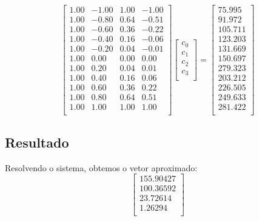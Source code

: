 \documentclass[12pt,a4paper]{article}
\begin{document}
\[
\left[
\begin{array}{cccc}
    1.00 & -1.00 & 1.00 & -1.00 \\
    1.00 & -0.80 & 0.64 & -0.51 \\
    1.00 & -0.60 & 0.36 & -0.22 \\
    1.00 & -0.40 & 0.16 & -0.06 \\
    1.00 & -0.20 & 0.04 & -0.01 \\
    1.00 & 0.00 & 0.00 & 0.00 \\
    1.00 & 0.20 & 0.04 & 0.01 \\
    1.00 & 0.40 & 0.16 & 0.06 \\
    1.00 & 0.60 & 0.36 & 0.22 \\
    1.00 & 0.80 & 0.64 & 0.51 \\
    1.00 & 1.00 & 1.00 & 1.00 \\
\end{array}
\right]
\left[
\begin{array}{c}
    c_0 \\
    c_1 \\
    c_2 \\
    c_3 \\
\end{array}
\right]
=
\left[
\begin{array}{c}
    75.995 \\
    91.972 \\
    105.711 \\
    123.203 \\
    131.669 \\
    150.697 \\
    279.323 \\
    203.212 \\
    226.505 \\
    249.633 \\
    281.422 \\
\end{array}
\right]
\]

\subsection{Resultado}
Resolvendo o sistema, obtemos o vetor aproximado:
\[
\left[
\begin{array}{c}
    155.90427 \\
    100.36592 \\
    23.72614 \\
    1.26294 \\
\end{array}
\right]
\]
\end{document}

